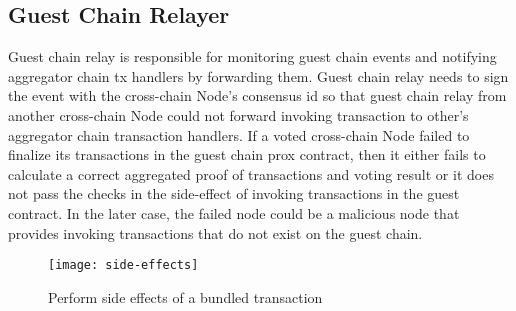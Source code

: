 \subsection{Guest Chain Relayer}
Guest chain relay is responsible for monitoring guest chain events and notifying aggregator chain tx handlers by forwarding them. Guest chain relay needs to sign the event with the cross-chain Node's consensus id so that guest chain relay from another cross-chain Node could not forward invoking transaction to other's aggregator chain transaction handlers. If a voted cross-chain Node failed to finalize its transactions in the guest chain prox contract, then it either fails to calculate a correct aggregated proof of transactions and voting result or it does not pass the checks in the side-effect of invoking transactions in the guest contract. In the later case, the failed node could be a malicious node that provides invoking transactions that do not exist on the guest chain.  
\begin{figure}[!ht]
\texttt{[image: side-effects]}
\caption{Perform side effects of a bundled transaction}
\label{sideffects}
\end{figure}


